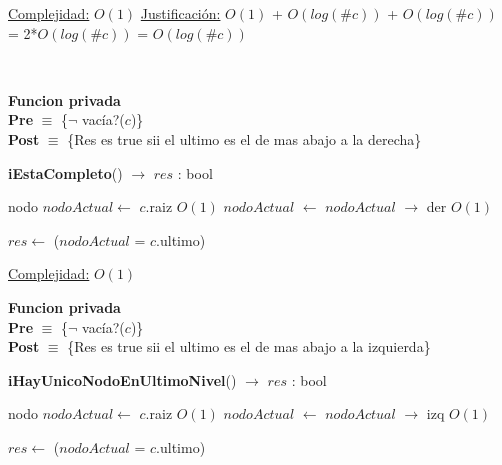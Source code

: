 \begin{Algoritmos}
\begin{algorithm}[H]
\begin{algorithmic}[1]
    \medskip
    \Statex \underline{Complejidad:} $O(1)$
    \Statex \underline{Justificaci\'on:} $O(1)$ + $O(log(\#c))$ + $O(log(\#c))$ = 2*$O(log(\#c))$ = $O(log(\#c))$
\end{algorithmic}
\end{algorithm}






$ $\newline
$ $\newline

\textbf{Funcion privada}\\
\textbf{Pre} $\equiv$ \{$\neg$ vac\'ia?($c$)\}\\%
\textbf{Post} $\equiv$ \{Res es true sii el ultimo es el de mas abajo a la derecha\}%
\begin{algorithm}[H]
{\textbf{iEstaCompleto}() $\to$ $res$ : bool}
\begin{algorithmic}[1]

    \State nodo $nodoActual \gets$ $c$.raiz \Comment $O(1)$
        $nodoActual$ $\gets$ $nodoActual$ $\rightarrow$ der \Comment $O(1)$
    \EndWhile

    \State $res \gets$ ($nodoActual$ = $c$.ultimo)

    \medskip
    \Statex \underline{Complejidad:} $O(1)$
\end{algorithmic}
\end{algorithm}

\textbf{Funcion privada}\\
\textbf{Pre} $\equiv$ \{$\neg$ vac\'ia?($c$)\}\\%
\textbf{Post} $\equiv$ \{Res es true sii el ultimo es el de mas abajo a la izquierda\}%
\begin{algorithm}[H]
{\textbf{iHayUnicoNodoEnUltimoNivel}() $\to$ $res$ : bool}
\begin{algorithmic}[1]

    \State nodo $nodoActual \gets$ $c$.raiz \Comment $O(1)$
        $nodoActual$ $\gets$ $nodoActual$ $\rightarrow$ izq \Comment $O(1)$
    \EndWhile

    \State $res \gets$ ($nodoActual$ = $c$.ultimo)


\end{algorithmic}
\end{algorithm}
\end{Algoritmos}
